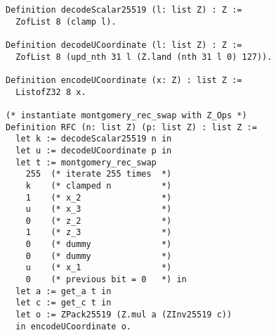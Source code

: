 \begin{lstlisting}[language=Coq]
Definition decodeScalar25519 (l: list Z) : Z :=
  ZofList 8 (clamp l).

Definition decodeUCoordinate (l: list Z) : Z :=
  ZofList 8 (upd_nth 31 l (Z.land (nth 31 l 0) 127)).

Definition encodeUCoordinate (x: Z) : list Z :=
  ListofZ32 8 x.

(* instantiate montgomery_rec_swap with Z_Ops *)
Definition RFC (n: list Z) (p: list Z) : list Z :=
  let k := decodeScalar25519 n in
  let u := decodeUCoordinate p in
  let t := montgomery_rec_swap
    255  (* iterate 255 times  *)
    k    (* clamped n          *)
    1    (* x_2                *)
    u    (* x_3                *)
    0    (* z_2                *)
    1    (* z_3                *)
    0    (* dummy              *)
    0    (* dummy              *)
    u    (* x_1                *)
    0    (* previous bit = 0   *) in
  let a := get_a t in
  let c := get_c t in
  let o := ZPack25519 (Z.mul a (ZInv25519 c))
  in encodeUCoordinate o.
\end{lstlisting}


%
%
%
%
